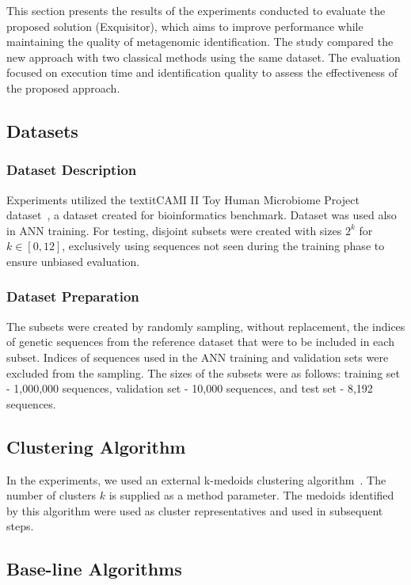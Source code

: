 \documentclass[biomedinformatics,article,submit,moreauthors]{Definitions/mdpi}
\begin{document}
                This section presents the results of the experiments conducted to evaluate the proposed solution (Exquisitor), which aims to improve performance while maintaining the quality of metagenomic identification. The study compared the new approach with two classical methods using the same dataset. The evaluation focused on execution time and identification quality to assess the effectiveness of the proposed approach.

        \subsection{Datasets}
            \subsubsection{Dataset Description}
                Experiments utilized the textit{CAMI II Toy Human Microbiome Project } dataset~\citep{Fritz:2019}, a dataset created for bioinformatics benchmark. Dataset was used also in ANN training. For testing, disjoint subsets were created with sizes $2^k$ for $k \in [0, 12]$, exclusively using sequences not seen during the training phase to ensure unbiased evaluation.

            \subsubsection{Dataset Preparation}
            The subsets were created by randomly sampling, without replacement, the indices of genetic sequences from the reference dataset that were to be included in each subset.
            Indices of sequences used in the ANN training and validation sets were excluded from the sampling. The sizes of the subsets were as follows: training set - 1,000,000 sequences, validation set - 10,000 sequences, and test set - 8,192 sequences.

        \subsection{Clustering Algorithm}
            In the experiments, we used an external k-medoids clustering algorithm~\citep{Rust:kmedoids}. 
            The number of clusters $k$ is supplied as a method parameter.
            The medoids identified by this algorithm were used as cluster representatives and used in subsequent steps.

        \subsection{Base-line Algorithms}
\end{document}
